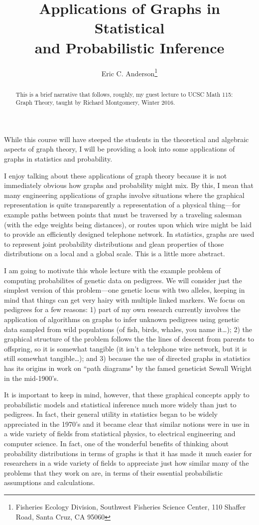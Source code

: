 \documentclass[11pt]{article}
\title{Applications of Graphs in Statistical \\
and Probabilistic Inference}
\author{Eric C. Anderson\thanks{
    Fisheries Ecology Division, 
    Southwest Fisheries Science Center, 
    110 Shaffer Road,
    Santa Cruz, CA 95060}
}
\begin{document}
\maketitle

\begin{abstract}
This is a brief narrative that follows, roughly, my guest lecture to
UCSC Math 115: Graph Theory, taught by Richard Montgomery, Winter 2016.
\end{abstract}

While this course will have steeped the students in the theoretical and algebraic
aspects of graph theory, I will be providing a look into some applications of
graphs in statistics and probability.

I enjoy talking about these
applications of graph theory because it is not immediately 
obvious how graphs and probability might mix.  
By this, I mean that many engineering applications of graphs involve situations where the graphical
representation is quite transparently a representation of a physical thing---for example
paths between points that must be traversed by a traveling salesman (with the edge weights
being distances), or routes upon which wire might be laid to provide an efficiently designed
telephone network.  In statistics, graphs are used to represent joint probability distributions
and glean properties of those distributions on a local and a global scale.  This is a little more
abstract. 

I am going to motivate this whole lecture with the example problem of computing probabilites of
genetic data on pedigrees.  We will consider just the simplest version of this problem---one genetic
locus with two alleles, keeping in mind that things can get very hairy with multiple linked markers. 
We focus on pedigrees for a few reasons: 1) part of my own research currently involves the application of 
algorithms on graphs to infer unknown pedigrees using genetic data sampled from wild populations 
(of fish, birds, whales, you name it\ldots); 2) the graphical structure of the problem follows the 
the lines of descent from parents to offspring, so it is somewhat tangible (it isn't
a telephone wire network, but it is still somewhat tangible\ldots); and 3) because the use
of directed graphs in statistics
has its origins in work on ``path diagrams" by the famed geneticist Sewall Wright in the mid-1900's.

It is important to keep in mind, however, that these graphical concepts apply to probabilistic models
and statistical inference much more widely than just to pedigrees.  In fact, their general utility 
in statistics began to be widely appreciated in the 1970's and it became clear that similar 
notions were in use in a wide variety of fields from statistical physics, to electrical engineering
and computer science.  In fact, one of the wonderful benefits of thinking about probability distributions
in terms of graphs is that it has made it much easier for researchers in a wide variety of fields to
appreciate just how similar many of the problems that they work on are, in terms of their 
essential probabilistic assumptions and calculations.  
\end{document}
